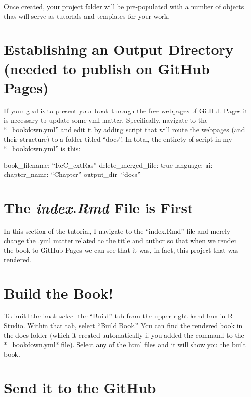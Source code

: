 \documentclass[
]{book}
\begin{document}
Once created, your project folder will be pre-populated with a number of objects that will serve as tutorials and templates for your work.

\hypertarget{establishing-an-output-directory-needed-to-publish-on-github-pages}{%
\section{Establishing an Output Directory (needed to publish on GitHub Pages)}\label{establishing-an-output-directory-needed-to-publish-on-github-pages}}

If your goal is to present your book through the free webpages of GitHub Pages it is necessary to update some yml matter. Specifically, navigate to the ``\_bookdown.yml'' and edit it by adding script that will route the webpages (and their structure) to a folder titled ``docs''. In total, the entirety of script in my ``\_bookdown.yml'' is this:

book\_filename: ``ReC\_extRas''
delete\_merged\_file: true
language:
ui:
chapter\_name: ``Chapter''
output\_dir: ``docs''

\hypertarget{the-index.rmd-file-is-first}{%
\section{\texorpdfstring{The \emph{index.Rmd} File is First}{The index.Rmd File is First}}\label{the-index.rmd-file-is-first}}

In this section of the tutorial, I navigate to the ``index.Rmd'' file and merely change the .yml matter related to the title and author so that when we render the book to GitHub Pages we can see that it was, in fact, this project that was rendered.

\hypertarget{build-the-book}{%
\section{Build the Book!}\label{build-the-book}}

To build the book select the ``Build'' tab from the upper right hand box in R Studio. Within that tab, select ``Build Book.'' You can find the rendered book in the docs folder (which it created automatically if you added the command to the *\_bookdown.yml* file). Select any of the html files and it will show you the built book.

\hypertarget{send-it-to-the-github}{%
\section{Send it to the GitHub}\label{send-it-to-the-github}}
\end{document}
